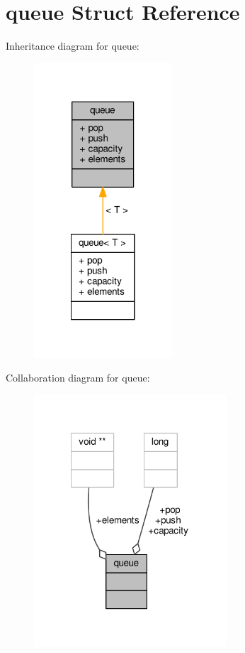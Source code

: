 \hypertarget{structqueue}{\section{queue Struct Reference}
\label{structqueue}
}


Inheritance diagram for queue\-:
\nopagebreak
\begin{figure}[H]
\begin{center}
\leavevmode
\includegraphics[width=146pt]{structqueue__inherit__graph}
\end{center}
\end{figure}


Collaboration diagram for queue\-:
\nopagebreak
\begin{figure}[H]
\begin{center}
\leavevmode
\includegraphics[width=204pt]{structqueue__coll__graph}
\end{center}
\end{figure}
